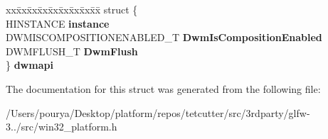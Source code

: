 \begin{DoxyCompactItemize}
\begin{tabbing}
\end{tabbing}\item 
\hypertarget{struct__GLFWlibraryWin32_aaf805f1fca3e8ff3f137775bebfd0f6b}{}\begin{tabbing}
xx\=xx\=xx\=xx\=xx\=xx\=xx\=xx\=xx\=\kill
struct \{\\
\>HINSTANCE {\bfseries instance}\\
\>DWMISCOMPOSITIONENABLED\_T {\bfseries DwmIsCompositionEnabled}\\
\>DWMFLUSH\_T {\bfseries DwmFlush}\\
\} {\bfseries dwmapi}\label{struct__GLFWlibraryWin32_aaf805f1fca3e8ff3f137775bebfd0f6b}
\\

\end{tabbing}\end{DoxyCompactItemize}


The documentation for this struct was generated from the following file\+:\begin{DoxyCompactItemize}
\item 
/\+Users/pourya/\+Desktop/platform/repos/tetcutter/src/3rdparty/glfw-\/3../src/win32\+\_\+platform.\+h\end{DoxyCompactItemize}
